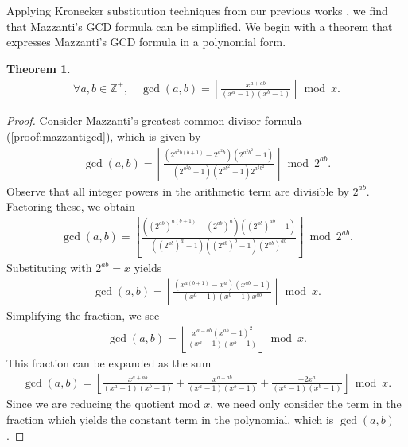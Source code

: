 \documentclass{article}
\theoremstyle{plain}
\newtheorem{theorem}{Theorem}
\theoremstyle{definition}
\newcommand{\floor}[1]{\left\lfloor #1 \right\rfloor}
\newcommand{\Z}{\mathbb{Z}}
\begin{document}
Applying Kronecker substitution techniques from our previous works \cite{shunia2023simple, shunia2024polynomial}, we find that Mazzanti's GCD formula can be simplified. We begin with a theorem that expresses Mazzanti's GCD formula in a polynomial form.

\begin{theorem} \label{proof:gcdpolynomial}
\begin{align*}
\forall a,b \in \Z^+, \quad
\gcd(a,b) = \floor{\frac{x^{a+ab}}{(x^a-1)(x^b-1)}}\bmod x .
\end{align*}
\end{theorem}
\begin{proof}
Consider Mazzanti's greatest common divisor formula (\cref{proof:mazzantigcd}), which is given by
\begin{align*}
\gcd(a,b) = \floor{\frac{(2^{a^2 b(b+1)} - 2^{a^2 b}) (2^{a^2 b^2} - 1)}
         {(2^{a^2 b} - 1)(2^{ab^2}-1)2^{a^2 b^2}}} \bmod 2^{ab}.
\end{align*}
Observe that all integer powers in the arithmetic term are divisible by $2^{ab}$. Factoring these, we obtain
\begin{align*}
\gcd(a,b) = \floor{\frac{((2^{ab})^{a (b+1)} - (2^{ab})^a) ((2^{ab})^{ab} - 1)}
 {((2^{ab})^{a} - 1)((2^{ab})^{b}-1) (2^{ab})^{ab}}} \bmod 2^{ab} .
\end{align*}
Substituting with $2^{ab} = x$ yields
\begin{align*}
\gcd(a,b) = \floor{\frac{(x^{a (b+1)} - x^a) (x^{ab} - 1)}
 {(x^{a} - 1)(x^{b}-1) x^{ab}}} \bmod x .
\end{align*}
Simplifying the fraction, we see
\begin{align*}
\gcd(a,b) = \floor{
\frac
{ x^{a-ab} (x^{ab} - 1)^2 }
{ (x^a-1)(x^b-1) }
}
 \bmod x .
\end{align*}
This fraction can be expanded as the sum
\begin{align*}
\gcd(a,b) =
\floor
{
    \frac{ x^{a+ab} }{ (x^a-1)(x^b-1) }
    + \frac{ x^{a-ab} }{ (x^a-1)(x^b-1) }
    + \frac{ -2x^a }{ (x^a-1)(x^b-1) }
}
 \bmod x .
\end{align*}
Since we are reducing the quotient mod $x$, we need only consider the term in the fraction which yields the constant term in the polynomial, which is $\gcd(a,b)$.


\end{proof}
\end{document}

